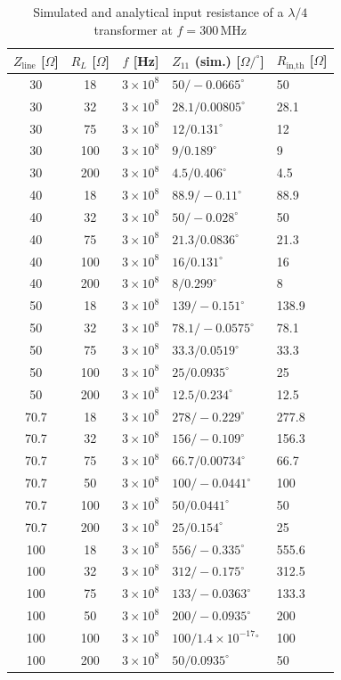 \documentclass[a4paper,12pt]{article}
\begin{document}
	
	\begin{table}[h]
		\centering
		\caption{Simulated and analytical input resistance of a $\lambda/4$ transformer at $f=300\,\mathrm{MHz}$}
		\label{tab:lambda4_theory}
		\begin{tabular}{cccll}
			\hline
			$Z_\text{line}$ [$\Omega$] & $R_L$ [$\Omega$] & $f$ [Hz] & $Z_{11}$ (sim.) [$\Omega/^\circ$] & $R_{\text{in,th}}$ [$\Omega$] \\
			\hline
			30 & 18  & $3\times10^8$ & $50 / -0.0665^\circ$ & 50 \\
			30 & 32  & $3\times10^8$ & $28.1 / 0.00805^\circ$ & 28.1 \\
			30 & 75  & $3\times10^8$ & $12 / 0.131^\circ$ & 12 \\
			30 & 100 & $3\times10^8$ & $9 / 0.189^\circ$ & 9 \\
			30 & 200 & $3\times10^8$ & $4.5 / 0.406^\circ$ & 4.5 \\
			\hline
			40 & 18  & $3\times10^8$ & $88.9 / -0.11^\circ$ & 88.9 \\
			40 & 32  & $3\times10^8$ & $50 / -0.028^\circ$ & 50 \\
			40 & 75  & $3\times10^8$ & $21.3 / 0.0836^\circ$ & 21.3 \\
			40 & 100 & $3\times10^8$ & $16 / 0.131^\circ$ & 16 \\
			40 & 200 & $3\times10^8$ & $8 / 0.299^\circ$ & 8 \\
			\hline
			50 & 18  & $3\times10^8$ & $139 / -0.151^\circ$ & 138.9 \\
			50 & 32  & $3\times10^8$ & $78.1 / -0.0575^\circ$ & 78.1 \\
			50 & 75  & $3\times10^8$ & $33.3 / 0.0519^\circ$ & 33.3 \\
			50 & 100 & $3\times10^8$ & $25 / 0.0935^\circ$ & 25 \\
			50 & 200 & $3\times10^8$ & $12.5 / 0.234^\circ$ & 12.5 \\
			\hline
			70.7 & 18  & $3\times10^8$ & $278 / -0.229^\circ$ & 277.8 \\
			70.7 & 32  & $3\times10^8$ & $156 / -0.109^\circ$ & 156.3 \\
			70.7 & 75  & $3\times10^8$ & $66.7 / 0.00734^\circ$ & 66.7 \\
			70.7 & 50  & $3\times10^8$ & $100 / -0.0441^\circ$ & 100 \\
			70.7 & 100 & $3\times10^8$ & $50 / 0.0441^\circ$ & 50 \\
			70.7 & 200 & $3\times10^8$ & $25 / 0.154^\circ$ & 25 \\
			\hline
			100 & 18  & $3\times10^8$ & $556 / -0.335^\circ$ & 555.6 \\
			100 & 32  & $3\times10^8$ & $312 / -0.175^\circ$ & 312.5 \\
			100 & 75  & $3\times10^8$ & $133 / -0.0363^\circ$ & 133.3 \\
			100 & 50  & $3\times10^8$ & $200 / -0.0935^\circ$ & 200 \\
			100 & 100 & $3\times10^8$ & $100 / 1.4\times10^{-17}{}^\circ$ & 100 \\
			100 & 200 & $3\times10^8$ & $50 / 0.0935^\circ$ & 50 \\
			\hline
		\end{tabular}
	\end{table}
	
	
	
	

	\vfill
	
		
	
	
	
	
\end{document}
